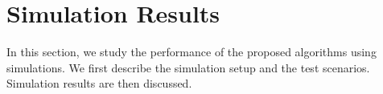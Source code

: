 \documentclass[journal]{IEEEtran}
\newcommand{\mbx}{\mathbf{x}}
\begin{document}
%
%
%
%


\section{Simulation Results}
\label{sec:simulation_results}
In this section, we study the performance of the proposed algorithms using simulations. We first describe the simulation setup and the test scenarios. Simulation results are then discussed.
\end{document}
